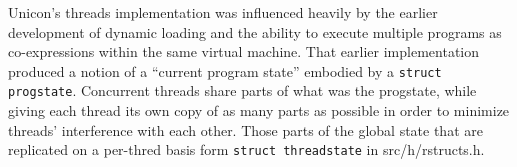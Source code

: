 Unicon's threads implementation was influenced heavily by the
earlier development of dynamic loading and the ability to execute
multiple programs as co-expressions within the same virtual machine.
That earlier implementation produced a notion of a ``current program
state'' embodied by a \texttt{struct progstate}. Concurrent threads
share parts of what was the progstate, while giving each thread its
own copy of as many parts as possible in order to minimize threads'
interference with each other.  Those parts of the global state that
are replicated on a per-thred basis form \texttt{struct threadstate}
in src/h/rstructs.h.

\begin{iconcode}
\end{iconcode}
